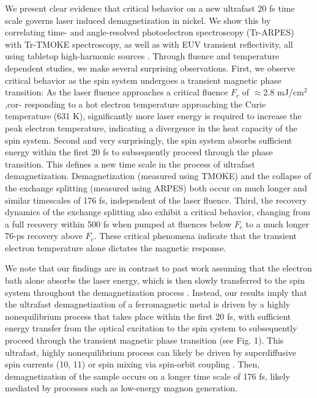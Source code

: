 We present clear evidence that critical behavior on a new ultrafast 20 fs time scale governs laser induced demagnetization in nickel. We show this by correlating time- and angle-resolved photoelectron spectroscopy (Tr-ARPES) with Tr-TMOKE spectroscopy, as well as with EUV transient reflectivity, all using tabletop high-harmonic sources \cite{La-O-Vorakiat2012}. Through fluence and temperature dependent studies, we make several surprising observations. First, we observe critical behavior as the spin system undergoes a transient magnetic phase transition: As the laser fluence approaches a critical fluence $F_c$ of $\approx$2.8 mJ/cm$^2$,cor- responding to a hot electron temperature approaching the Curie temperature (631 K), significantly more laser energy is required to increase the peak electron temperature, indicating a divergence in the heat capacity of the spin system. Second and very surprisingly, the spin system absorbs sufficient energy within the first 20 fs to subsequently proceed through the phase transition. This defines a new time scale in the process of ultrafast demagnetization. Demagnetization (measured using TMOKE) and the collapse of the exchange splitting (measured using ARPES) both occur on much longer and similar timescales of 176 fs, independent of the laser fluence. Third, the recovery dynamics of the exchange splitting also exhibit a critical behavior, changing from a full recovery within 500 fs when pumped at fluences below $F_c$ to a much longer 76-ps recovery above $F_c$. These critical phenomena indicate that the transient electron temperature alone dictates the magnetic response.

We note that our findings are in contrast to past work assuming that the electron bath alone absorbs the laser energy, which is then slowly transferred to the spin system throughout the demagnetization process \cite{Koopmans2010,Bigot2009,Mueller2013,Roth2012}. Instead, our results imply that the ultrafast demagnetization of a ferromagnetic metal is driven by a highly nonequilibrium process that takes place within the first 20 fs, with sufficient energy transfer from the optical excitation to the spin system to subsequently proceed through the transient magnetic phase transition (see Fig. 1). This ultrafast, highly nonequilibrium process can likely be driven by superdiffusive spin currents (10, 11) or spin mixing via spin-orbit coupling \cite{Tows2015,Zhang2012,Krieger2015}. Then, demagnetization of the sample occurs on a longer time scale of 176 fs, likely mediated by processes such as low-energy magnon generation.

